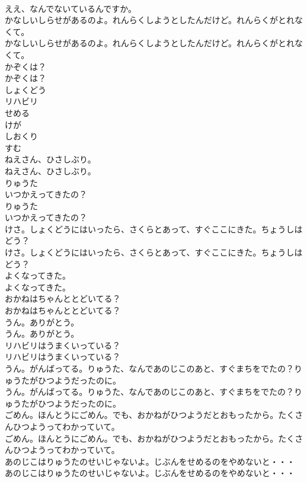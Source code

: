 \documentclass[8pt]{extreport}
\begin{document}
\begin{CJK}{UTF8}{min}
\\	ええ、なんでないているんですか。
\\	かなしいしらせがあるのよ。れんらくしようとしたんだけど。れんらくがとれなくて。
\\	かなしいしらせがあるのよ。れんらくしようとしたんだけど。れんらくがとれなくて。
\\	かぞくは？
\\	かぞくは？
\\	しょくどう
\\	リハビリ
\\	せめる
\\	けが
\\	しおくり
\\	すむ
\\	ねえさん、ひさしぶり。
\\	ねえさん、ひさしぶり。
\\	りゅうた
\\	いつかえってきたの？
\\	りゅうた
\\	いつかえってきたの？
\\	けさ。しょくどうにはいったら、さくらとあって、すぐここにきた。ちょうしはどう？
\\	けさ。しょくどうにはいったら、さくらとあって、すぐここにきた。ちょうしはどう？
\\	よくなってきた。
\\	よくなってきた。
\\	おかねはちゃんととどいてる？
\\	おかねはちゃんととどいてる？
\\	うん。ありがとう。
\\	うん。ありがとう。
\\	リハビリはうまくいっている？
\\	リハビリはうまくいっている？
\\	うん。がんばってる。りゅうた、なんであのじこのあと、すぐまちをでたの？りゅうたがひつようだったのに。
\\	うん。がんばってる。りゅうた、なんであのじこのあと、すぐまちをでたの？りゅうたがひつようだったのに。
\\	ごめん。ほんとうにごめん。でも、おかねがひつようだとおもったから。たくさんひつようってわかっていて。
\\	ごめん。ほんとうにごめん。でも、おかねがひつようだとおもったから。たくさんひつようってわかっていて。
\\	あのじこはりゅうたのせいじゃないよ。じぶんをせめるのをやめないと・・・
\\	あのじこはりゅうたのせいじゃないよ。じぶんをせめるのをやめないと・・・

\end{CJK}
\end{document}
